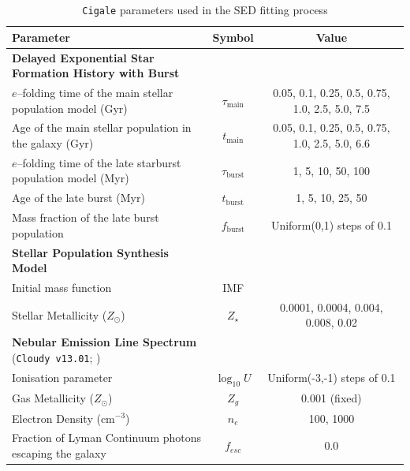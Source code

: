 \documentclass[twocolumn,tight,times,linenumbers]{aastex631}
\begin{document}
            \appendix
		\begin{table}
			\caption{\texttt{Cigale} parameters used in the SED fitting process}
			\label{table:cigale}
			\centering
			\begin{tabular*}{\textwidth}{@{\extracolsep{\fill}}lcc}
				\hline
				Parameter & Symbol & Value \\
				\hline
				\textbf{Delayed Exponential Star Formation History with Burst} & & \\
				$e$--folding time of the main stellar population model (Gyr)     & $\tau_\textrm{main}$ & 0.05, 0.1, 0.25, 0.5, 0.75, 1.0, 2.5, 5.0, 7.5 \\
				Age of the main stellar population in the galaxy (Gyr)                 & $t_\textrm{main}$       & 0.05, 0.1, 0.25, 0.5, 0.75, 1.0, 2.5, 5.0, 6.6 \\
				$e$--folding time of the late starburst population model (Myr) & $\tau_\textrm{burst}$ & 1, 5, 10, 50, 100 \\
				Age of the late burst (Myr)                                                                & $t_\textrm{burst}$      & 1, 5, 10, 25, 50 \\
				Mass fraction of the late burst population                                    & $f_\textrm{burst}$      &  Uniform(0,1) steps of 0.1 \\
				\hline
				\textbf{Stellar Population Synthesis Model} \citep{Bruzual2003}         &                                        &  \\
				Initial mass function																		 &  IMF          					   & \citet{Chabrier2003} \\
				Stellar Metallicity ($Z_\odot$) 													  & $Z_\star$                      & 0.0001, 0.0004, 0.004, 0.008, 0.02 \\
				\hline
				\textbf{Nebular Emission Line Spectrum} (\texttt{Cloudy v13.01}; \citealt{Ferland1998,Ferland2013}) & & \\
				Ionisation parameter																	   & $\log_{10} U$	              & Uniform(-3,-1) steps of 0.1 \\		 
				Gas Metallicity ($Z_\odot$)															  & $Z_g$         & 0.001 (fixed) \\
				Electron Density (cm$^{-3}$)														& $n_e$							  & 100, 1000 \\
				Fraction of Lyman Continuum photons escaping the galaxy      & $f_{esc}$					 & 0.0 \\

\end{tabular*}
\end{table}
\end{document}
